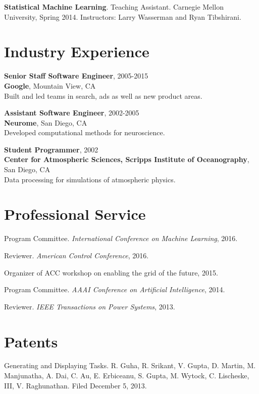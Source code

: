 \documentclass[margin, line]{res}
\begin{document}
\begin{resume}
{\bf Statistical Machine Learning}. Teaching Assistant. Carnegie Mellon
University, Spring 2014. Instructors: Larry Wasserman and Ryan Tibshirani.

\section{Industry Experience}

{\bf Senior Staff Software Engineer}, 2005-2015 \\
{\bf Google}, Mountain View, CA \\
Built and led teams in search, ads as well as new product areas.

{\bf Assistant Software Engineer}, 2002-2005 \\
{\bf Neurome}, San Diego, CA \\
Developed computational methods for neuroscience.

{\bf Student Programmer}, 2002 \\
{\bf Center for Atmospheric Sciences, Scripps Institute of Oceanography}, San
Diego, CA \\
Data processing for simulations of atmospheric physics.


\section{Professional Service}

Program Committee. \emph{International Conference on Machine Learning}, 2016.

Reviewer. \emph{American Control Conference}, 2016.

Organizer of ACC workshop on enabling the grid of the future, 2015.

Program Committee. \emph{AAAI Conference on Artificial Intelligence}, 2014.

Reviewer. \emph{IEEE Transactions on Power Systems}, 2013.

\section{Patents}

Generating and Displaying Tasks. R. Guha, R. Srikant, V. Gupta, D. Martin,
M. Manjunatha, A. Dai, C. Au,  E. Erbiceanu, S. Gupta, M. Wytock, C. Lischeske,
III, V. Raghunathan. Filed December 5, 2013.


\end{resume}
\end{document}
